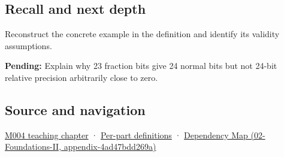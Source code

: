 \subsection{Recall and next depth}\label{appendix-a24fd710cf67-recall-and-next-depth}

Reconstruct the concrete example in the definition and identify its validity assumptions.

\textbf{Pending:} Explain why 23 fraction bits give 24 normal bits but not 24-bit relative precision arbitrarily close to zero.

\subsection{Source and navigation}\label{appendix-a24fd710cf67-source-and-navigation}

\hyperref[01-foundations-i-ch001-a-stretching-ruler-for-real-valued-quantities]{M004 teaching chapter} · \hyperref[appendix-fd090d982a15-m004---parts-61-76]{Per-part definitions} · \href{../02-Foundations-II/main.pdf\#nameddest=appendix-4ad47bdd269a}{Dependency Map (02-Foundations-II, appendix-4ad47bdd269a)}
